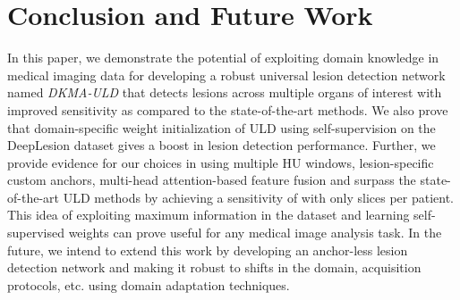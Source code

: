 \documentclass{bmvc2k}
\begin{document}
\vspace{-2mm}
\section{Conclusion and Future Work}
\label{sec:conclusion}

In this paper, we demonstrate the potential of exploiting domain knowledge in medical imaging data for developing a robust universal lesion detection network named \emph{DKMA-ULD} that detects lesions across multiple organs of interest with improved sensitivity as compared to the state-of-the-art methods. We also prove that domain-specific weight initialization of ULD using self-supervision on the DeepLesion dataset gives a boost in lesion detection performance. Further, we provide evidence for our choices in using multiple HU windows, lesion-specific custom anchors, multi-head attention-based feature fusion and surpass the state-of-the-art ULD methods by achieving a sensitivity of  with only  slices per patient. This idea of exploiting maximum information in the dataset and learning self-supervised weights can prove useful for any medical image analysis task. 
In the future, we intend to extend this work by developing an anchor-less lesion detection network and making it robust to shifts in the domain, acquisition protocols, etc. using domain adaptation techniques. 






\end{document}
